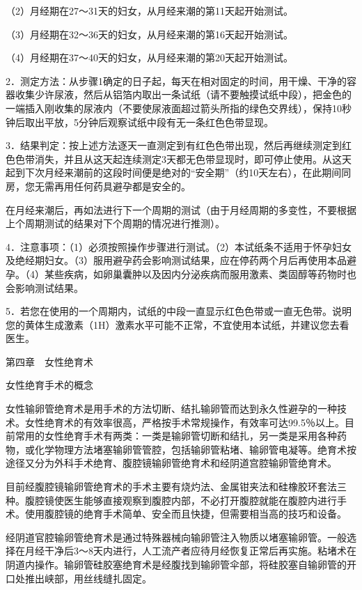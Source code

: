 \documentclass[12pt,UTF8]{ctexbook}
\begin{document}
（2）月经期在27～31天的妇女，从月经来潮的第11天起开始测试。

（3）月经期在32～36天的妇女，从月经来潮的第16天起开始测试。

（4）月经期在37～40天的妇女，从月经来潮的第20天起开始测试。

2．测定方法：从步骤1确定的日子起，每天在相对固定的时间，用干燥、干净的容器收集少许尿液，然后从铝箔内取出一条试纸（请不要触摸试纸中段），把金色的一端插入刚收集的尿液内（不要使尿液面超过箭头所指的绿色交界线），保持10秒钟后取出平放，5分钟后观察试纸中段有无一条红色色带显现。

3．结果判定：按上述方法逐天一直测定到有红色色带出现，然后再继续测定到红色色带消失，并且从这天起连续测定3天都无色带显现时，即可停止使用。从这天起到下次月经来潮前的这段时间便是绝对的“安全期”（约10天左右），在此期间同房，您无需再用任何药具避孕都是安全的。

在月经来潮后，再如法进行下一个周期的测试（由于月经周期的多变性，不要根据上个周期测试的结果对下个周期的情况进行推测）。

4．注意事项：（1）必须按照操作步骤进行测试。（2）本试纸条不适用于怀孕妇女及绝经期妇女。（3）服用避孕药会影响测试结果，应在停药两个月后再使用本品避孕。（4）某些疾病，如卵巢囊肿以及因内分泌疾病而服用激素、类固醇等药物时也会影响测试结果。

5．若您在使用的一个周期内，试纸的中段一直显示红色色带或一直无色带。说明您的黄体生成激素（1H）激素水平可能不正常，不宜使用本试纸，并建议您去看医生。





第四章　女性绝育术


女性绝育手术的概念


女性输卵管绝育术是用手术的方法切断、结扎输卵管而达到永久性避孕的一种技术。女性绝育术的有效率很高，严格按手术常规操作，有效率可达99.5％以上。目前常用的女性绝育手术有两类：一类是输卵管切断和结扎，另一类是采用各种药物，或化学物理方法堵塞输卵管管腔，包括输卵管粘堵、输卵管电凝等。绝育术按途径又分为外科手术绝育、腹腔镜输卵管绝育术和经阴道宫腔输卵管绝育术。

目前经腹腔镜输卵管绝育术的手术主要有烧灼法、金属钳夹法和硅橡胶环套法三种。腹腔镜使医生能够直接观察到腹腔内部，不必打开腹腔就能在腹腔内进行手术。使用腹腔镜的绝育手术简单、安全而且快捷，但需要相当高的技巧和设备。

经阴道官腔输卵管绝育术是通过特殊器械向输卵管注入物质以堵塞输卵管。一般选择在月经干净后3～8天内进行，人工流产者应待月经恢复正常后再实施。粘堵术在阴道内操作。输卵管硅胶塞绝育术是经腹找到输卵管伞部，将硅胶塞自输卵管的开口处推出峡部，用丝线缝扎固定。
\end{document}
